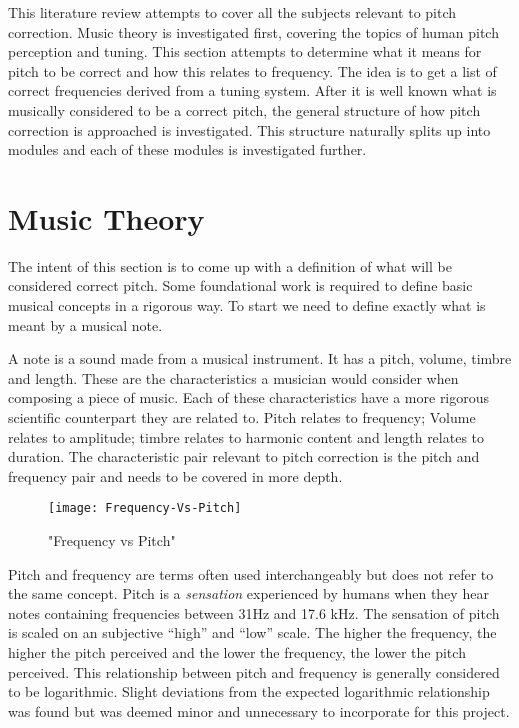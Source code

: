 
This literature review attempts to cover all the subjects relevant to pitch
correction. Music theory is investigated first, covering the topics of human
pitch perception and tuning. This section attempts to determine what it means for
pitch to be correct and how this relates to frequency. The idea is to get a list of
correct frequencies derived from a tuning system. After it is well known what
is musically considered to be a correct pitch, the general structure of how pitch
correction is approached is investigated. This structure naturally splits up into
modules and each of these modules is investigated further.

\section{Music Theory}

The intent of this section is to come up with a definition of what will be
considered correct pitch. Some foundational work is required to define basic
musical concepts in a rigorous way. To start we need to define exactly what is
meant by a musical note.

A note is a sound made from a musical instrument. It has a pitch, volume, timbre
and length. These are the characteristics a musician would consider when composing
a piece of music. Each of these characteristics have a more rigorous scientific
counterpart they are related to. Pitch relates to frequency; Volume relates to
amplitude; timbre relates to harmonic content and length relates to duration. The
characteristic pair relevant to pitch correction is the pitch and frequency pair
and needs to be covered in more depth.

\begin{wrapfigure}{L}{0.5\textwidth}
\texttt{[image: Frequency-Vs-Pitch]}
\caption{"Frequency vs Pitch"}
\label{fig:FrequencyVsPitch}
\end{wrapfigure}

Pitch and frequency are terms often used interchangeably but does not refer to the
same concept. Pitch is a \textit{sensation} experienced by humans when they hear
notes containing frequencies between 31Hz and 17.6 kHz\cite{Hearing}. The
sensation of pitch is scaled on an subjective ``high'' and ``low'' scale. The
higher the frequency, the higher the pitch perceived and the lower the frequency,
the lower the pitch perceived. This relationship between pitch and frequency is
generally considered to be logarithmic. Slight deviations from the expected
logarithmic relationship was found\cite{PitchVsFrequency} but was deemed minor
and unnecessary to incorporate for this project.

